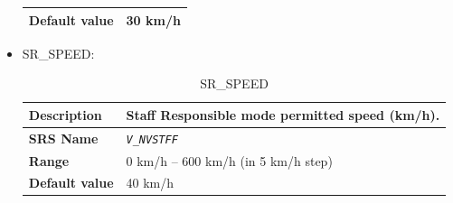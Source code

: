\documentclass{template/openetcs}
\begin{document}
\begin{itemize}
\begin{longtable}{|l|l|}
				\hline
										
					\begin{minipage}[t]{0.22\linewidth} \textbf{Default value}	\end{minipage} 
				&	\begin{minipage}[t]{0.78\linewidth} 30 km/h \end{minipage} \\
				
				\hline
				
			\end{longtable}
			
			
		\item SR\_SPEED:
			\begin{longtable}{|l|l|}
				\caption{SR\_SPEED}\\ 							
				\hline
				
					\begin{minipage}[t]{0.22\linewidth} \textbf{Description}	\end{minipage} 
				&	\begin{minipage}[t]{0.78\linewidth} Staff Responsible mode permitted speed (km/h). \end{minipage} \\
				
				\hline
				
					\begin{minipage}[t]{0.22\linewidth} \textbf{SRS Name}	\end{minipage} 
				&	\begin{minipage}[t]{0.78\linewidth} \emph{\texttt{V\_NVSTFF}} \end{minipage} \\
				
				\hline
														
					\begin{minipage}[t]{0.22\linewidth} \textbf{Range}	\end{minipage} 
				&	\begin{minipage}[t]{0.78\linewidth} 0 km/h – 600 km/h (in 5 km/h step) \end{minipage} \\
				
				\hline
										
					\begin{minipage}[t]{0.22\linewidth} \textbf{Default value}	\end{minipage} 
				&	\begin{minipage}[t]{0.78\linewidth} 40 km/h \end{minipage} \\
				

\end{longtable}
\end{itemize}
\end{document}
